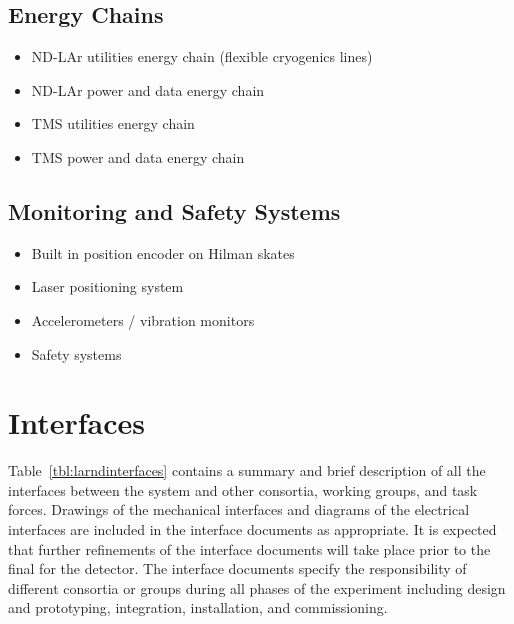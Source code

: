 \subsection{Energy Chains}
\label{sec:prism-des-wbs2}
\begin{itemize}
    \item ND-LAr utilities energy chain (flexible cryogenics lines)
    \item ND-LAr power and data energy chain
    \item TMS utilities energy chain
    \item TMS power and data energy chain
\end{itemize}

\subsection{Monitoring and Safety Systems}
\label{sec:prism-des-wbs3}
\begin{itemize}
    \item Built in position encoder on Hilman skates
    \item Laser positioning system
    \item Accelerometers / vibration monitors
    \item Safety systems
\end{itemize}




\section{Interfaces}
\label{sec:prism-interface}

Table~\ref{tbl:larndinterfaces} contains a summary and brief description of all the interfaces between the  system and other consortia, working groups, and task forces.
Drawings of the mechanical interfaces and diagrams of the electrical interfaces are 
included in the interface documents as appropriate.
It is expected that further refinements of the interface documents will take place prior to the final  for the detector. The interface documents specify the responsibility of different consortia or groups during all phases of the experiment including design and prototyping, integration,  installation, and  commissioning.


